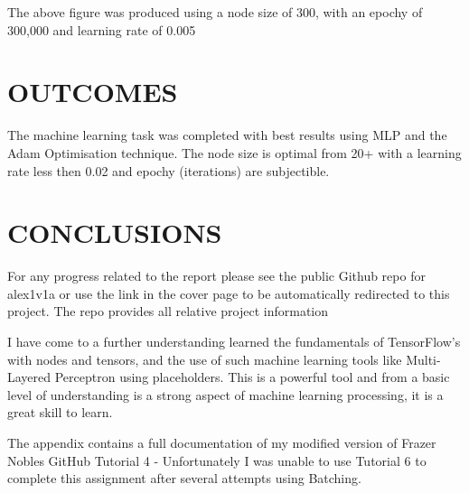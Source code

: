 \documentclass[a4paper, 10pt]{IEEEconf}
\begin{document}
The above figure was produced using a node size of 300, with an epochy of 300,000 and learning rate of 0.005


\section{OUTCOMES}

The machine learning task was completed with best results using MLP and the Adam Optimisation technique. The node size is optimal from 20+ with a learning rate less then 0.02 and epochy (iterations) are subjectible.


\section{CONCLUSIONS}

For any progress related to the report please see the public Github repo for alex1v1a or use the link in the cover page to be automatically redirected to this project. The repo provides all relative project information

I have come to a further understanding learned the fundamentals of TensorFlow's with nodes and tensors, and the use of such machine learning tools like Multi-Layered Perceptron using placeholders. This is a powerful tool and from a basic level of understanding is a strong aspect of machine learning processing, it is a great skill to learn. 

The appendix contains a full documentation of my modified version of Frazer Nobles GitHub Tutorial 4 - Unfortunately I was unable to use Tutorial 6 to complete this assignment after several attempts using Batching.


\nocite{*}



\end{document}

